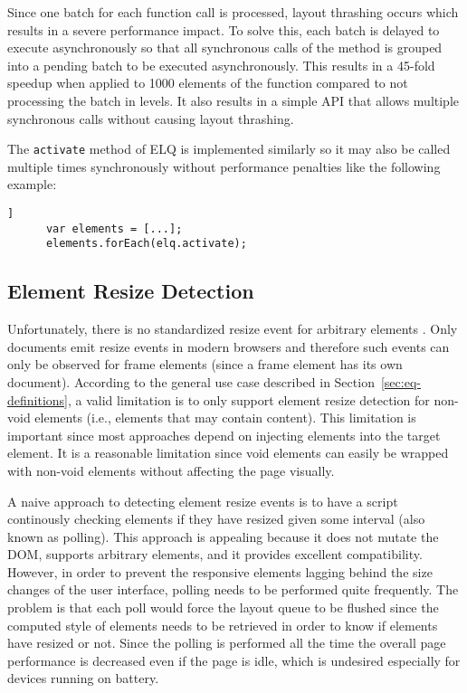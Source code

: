 \documentclass{acm_proc_article-sp}
\newcommand{\code}[1]{\texttt{#1}}
\newcommand{\elq}{ELQ}
\newcommand{\gls}[1]{#1}
\begin{document}
    Since one batch for each function call is processed, layout thrashing occurs which results in a severe performance impact.
    To solve this, each batch is delayed to execute asynchronously so that all synchronous calls of the method is grouped into a pending batch to be executed asynchronously.
    This results in a 45-fold speedup when applied to 1000 elements of the function compared to not processing the batch in levels.
    It also results in a simple API that allows multiple synchronous calls without causing layout thrashing.

    The \code{activate} method of \elq{} is implemented similarly so it may also be called multiple times synchronously without performance penalties like the following example:

    \begin{lstlisting}[gobble=6,label={},caption={},captionpos=b]]
      var elements = [...];
      elements.forEach(elq.activate);
    \end{lstlisting}
  
  \subsection{Element Resize Detection}\label{sec:imp_erd}
    Unfortunately, there is no standardized resize event for arbitrary elements \cite{w3c_dom2_events}.
    Only documents emit resize events in modern browsers and therefore such events can only be observed for frame elements (since a frame \gls{element} has its own \gls{document}).
    According to the general use case described in Section~\ref{sec:eq-definitions}, a valid limitation is to only support \gls{element} resize detection for non-void elements (i.e., elements that may contain content).
    This limitation is important since most approaches depend on injecting elements into the target \gls{element}.
    It is a reasonable limitation since void elements can easily be wrapped with non-void elements without affecting the page visually.

    A naive approach to detecting element resize events is to have a script continously checking elements if they have resized given some interval (also known as polling).
    This approach is appealing because it does not mutate the \gls{DOM}, supports arbitrary elements, and it provides excellent compatibility.
    However, in order to prevent the \gls{responsive} elements lagging behind the size changes of the user interface, polling needs to be performed quite frequently.
    The problem is that each poll would force the layout queue to be flushed since the computed style of elements needs to be retrieved in order to know if elements have resized or not.
    Since the polling is performed all the time the overall page performance is decreased even if the page is idle, which is undesired especially for devices running on battery.
\end{document}
